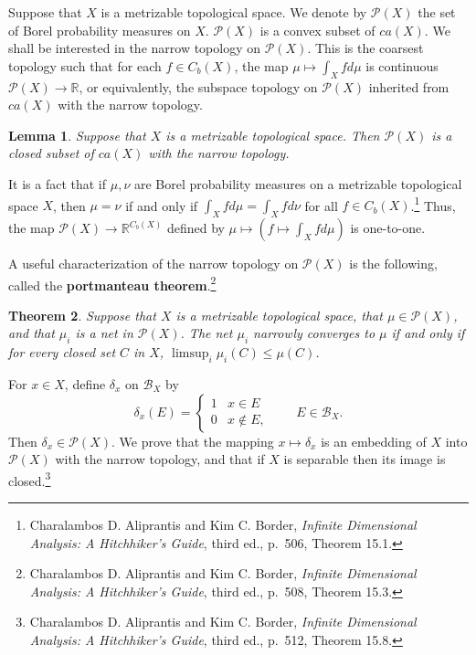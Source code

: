 \documentclass{article}
\newtheorem{theorem}{Theorem}
\newtheorem{lemma}[theorem]{Lemma}
\theoremstyle{definition}
\begin{document}
Suppose that $X$ is a metrizable topological space. We denote by $\mathscr{P}(X)$ the set of Borel probability measures on $X$.
$\mathscr{P}(X)$ is a convex subset of $ca(X)$.
We shall be interested in the narrow topology on $\mathscr{P}(X)$. This is  the coarsest topology such that for each $f \in C_b(X)$, the map
$\mu \mapsto \int_X f d\mu$ is continuous $\mathscr{P}(X) \to \mathbb{R}$, or equivalently, the subspace topology on $\mathscr{P}(X)$ inherited from $ca(X)$ with the narrow
topology. 

\begin{lemma}
Suppose that $X$ is a metrizable topological space. Then $\mathscr{P}(X)$ is a closed subset of $ca(X)$ with the narrow
topology.
\label{closedstar}
\end{lemma}

 It is a fact that if $\mu,\nu$ are Borel probability measures on a metrizable
topological space $X$, then $\mu=\nu$ if and only if $\int_X f d\mu = \int_X f d\nu$ for all $f \in C_b(X)$.\footnote{Charalambos D. 
Aliprantis and Kim C. Border, {\em Infinite Dimensional Analysis: A Hitchhiker's Guide}, third ed., p.~506, Theorem 15.1.}
Thus, the map $\mathscr{P}(X) \to \mathbb{R}^{C_b(X)}$ defined by $\mu \mapsto (f \mapsto \int_X f d\mu)$ is one-to-one.

A useful characterization of the narrow topology on $\mathscr{P}(X)$ is the following, called the \textbf{portmanteau theorem}.\footnote{Charalambos D. 
Aliprantis and Kim C. Border, {\em Infinite Dimensional Analysis: A Hitchhiker's Guide}, third ed., p.~508, Theorem 15.3.}

\begin{theorem}
Suppose that $X$ is a metrizable topological space, that $\mu \in \mathscr{P}(X)$, and that $\mu_i$ is a net in $\mathscr{P}(X)$. The net
$\mu_i$ narrowly  converges  to $\mu$ if and only
if for every closed set $C$ in $X$, $\limsup_i \mu_i(C) \leq \mu(C)$.
\label{153}
\end{theorem}

For $x \in X$, define $\delta_x$ on $\mathscr{B}_X$ by
\[
\delta_x(E) = \begin{cases}
1&x \in E\\
0&x \not \in E,
\end{cases}
\qquad E \in \mathscr{B}_X.
\]
Then $\delta_x \in \mathscr{P}(X)$. 
We  prove that the mapping $x \mapsto \delta_x$ is an embedding of $X$ into $\mathscr{P}(X)$ with the narrow topology,
and that if $X$ is separable then its image is closed.\footnote{Charalambos D. 
Aliprantis and Kim C. Border, {\em Infinite Dimensional Analysis: A Hitchhiker's Guide}, third ed., p.~512, Theorem 15.8.}
\end{document}
